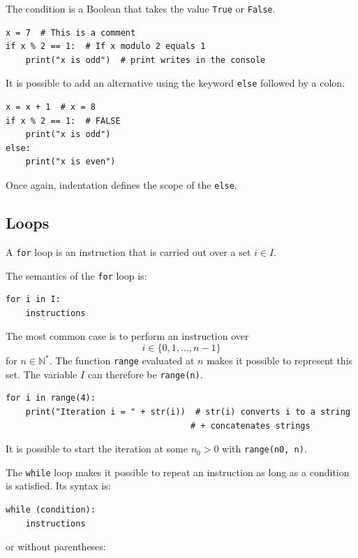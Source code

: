 \documentclass[11pt]{article}
\begin{document}
The condition is a Boolean that takes the value \texttt{True} or \texttt{False}.

\begin{lstlisting}
x = 7  # This is a comment
if x % 2 == 1:  # If x modulo 2 equals 1
    print("x is odd")  # print writes in the console
\end{lstlisting}

It is possible to add an alternative using the keyword \texttt{else} followed by a colon.

\begin{lstlisting}
x = x + 1  # x = 8
if x % 2 == 1:  # FALSE
    print("x is odd")
else:
    print("x is even")
\end{lstlisting}

Once again, indentation defines the scope of the \texttt{else}.

\subsection{Loops}

A \texttt{for} loop is an instruction that is carried out over a set $i\in I$.

The semantics of the \texttt{for} loop is:
\begin{lstlisting}
for i in I:
    instructions
\end{lstlisting}

The most common case is to perform an instruction over
\[
i\in\{0,1,\dots,n-1\}
\]
for $n\in\mathbb{N}^*$.  
The function \texttt{range} evaluated at $n$ makes it possible to represent this set. The variable $I$ can therefore be \texttt{range(n)}.

\begin{lstlisting}
for i in range(4):
    print("Iteration i = " + str(i))  # str(i) converts i to a string
                                     # + concatenates strings
\end{lstlisting}

It is possible to start the iteration at some $n_0>0$ with \texttt{range(n0, n)}.

\medskip
The \texttt{while} loop makes it possible to repeat an instruction as long as a condition is satisfied. Its syntax is:

\begin{lstlisting}
while (condition):
    instructions
\end{lstlisting}

or without parentheses:
\end{document}
